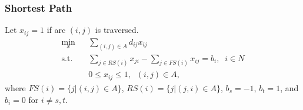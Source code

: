 \documentclass[12pt,handout]{beamer}
\begin{document}
\begin{frame}
\frametitle{Shortest Path}
Let $x_{ij} = 1$ if arc $(i,j)$ is traversed.
\begin{eqnarray}
\min_x && \sum_{(i,j) \in A} d_{ij} x_{ij} \nonumber \\
\mbox{s.t.} && \sum_{j \in RS(i)} x_{ji} - \sum_{j \in FS(i)} x_{ij} = b_i,\;\;i \in N \nonumber \\
&& 0 \le x_{ij} \le 1,\;\;(i,j) \in A, \nonumber
\end{eqnarray}
\noindent where $FS(i) = \{j | (i,j) \in A\}$, $RS(i) = \{j | (j, i) \in A\}$, $b_s = -1$, $b_t = 1$, and $b_i = 0$ for $i \neq s, t$.
\end{frame}
\end{document}
